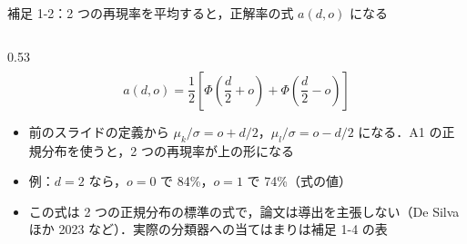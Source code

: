 \begin{frame}{補足 1-2：2 つの再現率を平均すると，正解率の式 $a(d,o)$ になる}
\begin{columns}[T,onlytextwidth]
\begin{column}{0.53\textwidth}
{\begin{align*}
      \end{align*}
      \[ a(d,o) = \frac12\left[\Phi\!\left(\frac d2 + o\right) + \Phi\!\left(\frac d2 - o\right)\right] \]}
      \begin{itemize}\scriptsize\setlength{\itemsep}{3pt}
        \item 前のスライドの定義から $\mu_k/\sigma = o + d/2$，$\mu_l/\sigma = o - d/2$ になる．A1 の正規分布を使うと，2 つの再現率が上の形になる
        \item 例：$d=2$ なら，$o=0$ で 84\%，$o=1$ で 74\%（式の値）
        \item この式は 2 つの正規分布の標準の式で，論文は導出を主張しない（De Silva ほか 2023 など）．実際の分類器への当てはまりは補足 1-4 の表
      \end{itemize}
    \end{column}
  \end{columns}
\end{frame}

